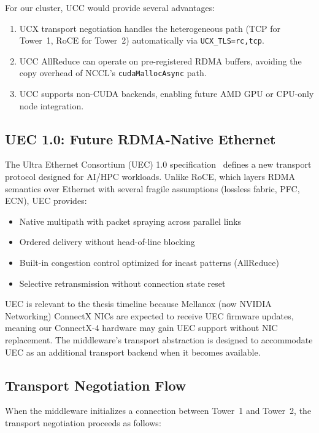 \documentclass[11pt,letterpaper]{article}
\theoremstyle{definition}
\begin{document}
For our cluster, UCC would provide several advantages:
\begin{enumerate}
    \item UCX transport negotiation handles the heterogeneous path (TCP for Tower~1, RoCE for Tower~2) automatically via \texttt{UCX\_TLS=rc,tcp}.
    \item UCC AllReduce can operate on pre-registered RDMA buffers, avoiding the copy overhead of NCCL's \texttt{cudaMallocAsync} path.
    \item UCC supports non-CUDA backends, enabling future AMD GPU or CPU-only node integration.
\end{enumerate}

\subsection{UEC 1.0: Future RDMA-Native Ethernet}

The Ultra Ethernet Consortium (UEC) 1.0 specification~\cite{uec2025} defines a new transport protocol designed for AI/HPC workloads. Unlike RoCE, which layers RDMA semantics over Ethernet with several fragile assumptions (lossless fabric, PFC, ECN), UEC provides:
\begin{itemize}
    \item Native multipath with packet spraying across parallel links
    \item Ordered delivery without head-of-line blocking
    \item Built-in congestion control optimized for incast patterns (AllReduce)
    \item Selective retransmission without connection state reset
\end{itemize}

UEC is relevant to the thesis timeline because Mellanox (now NVIDIA Networking) ConnectX NICs are expected to receive UEC firmware updates, meaning our ConnectX-4 hardware may gain UEC support without NIC replacement. The middleware's transport abstraction is designed to accommodate UEC as an additional transport backend when it becomes available.

\subsection{Transport Negotiation Flow}

When the middleware initializes a connection between Tower~1 and Tower~2, the transport negotiation proceeds as follows:
\end{document}
